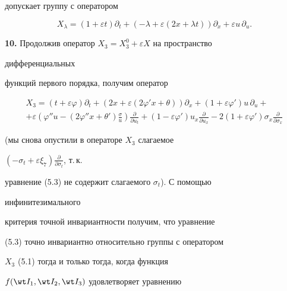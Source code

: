 допускает группу с оператором 


\begin{equation} 


X_\lambda=(1+\varepsilon t)\partial _t+(-\lambda+\varepsilon 


(2x+\lambda t))\partial _x+\varepsilon u\,\partial _u. 


\tag{9.12} 


\end{equation} 


 


{\bf 10.} Продолжив оператор $X_3=X^0_3+\varepsilon{}X$ на пространство 


дифференциальных 


функций первого порядка, получим оператор 


\begin{multline*} 


X_3=(t+\varepsilon\varphi)\partial _t+ 


(2x+\varepsilon(2\varphi'x+\theta))\partial _x+ 


(1+\varepsilon\varphi')u\,\partial _u+ \\ 


% 


+\varepsilon(\varphi''u-(2\varphi''x+\theta') 


\tfrac{\sigma}{u})\frac{\partial }{\partial u_t}+ 


(1-\varepsilon\varphi')u_x\frac{\partial }{\partial u_x}- 


2(1+\varepsilon\varphi')\sigma_x 


\frac{\partial }{\partial \sigma_x} 


\end{multline*} 


(мы снова опустили в операторе $X_3$ слагаемое 


$(-\sigma_t+\varepsilon\xi_7)\frac{\partial}{\partial\sigma_t}$, т.\,к. 


уравнение (5.3) не содержит слагаемого $\sigma_t$). С помощью 


инфинитезимального 


критерия точной инвариантности получим, что уравнение 


(5.3) точно инвариантно относительно группы с оператором 


$X_3$ (5.1) тогда и только тогда, когда функция 


$f(\wt I_1,\wt I_2,\wt I_3)$ удовлетворяет уравнению 


